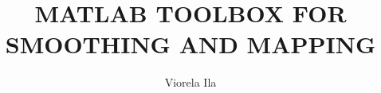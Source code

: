 \documentclass{article}
\begin{document}
\pagestyle{empty}
\title{\textbf{MATLAB TOOLBOX FOR SMOOTHING AND MAPPING}}
\author{Viorela Ila}



\maketitle

\pagestyle{fancy}
\fancyhf{}
\lhead[]{\thepage}
\rhead[\thepage]{}
\doublespacing

\renewcommand{\cftchapdotsep}{\cftdotsep}
\tableofcontents

\newpage

\end{document}
